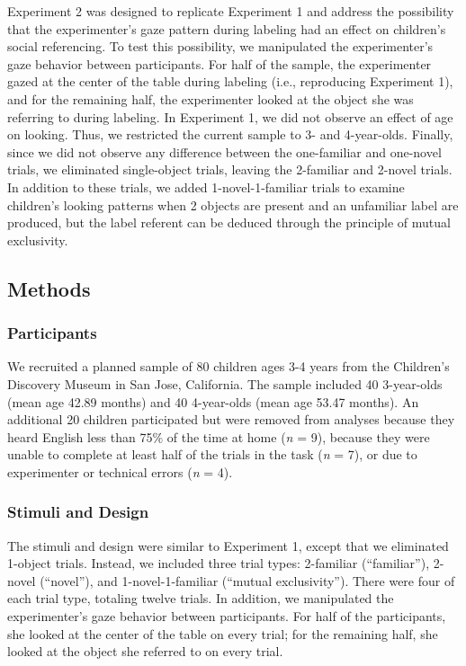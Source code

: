\documentclass[10pt, letterpaper]{article}
\begin{document}
Experiment 2 was designed to replicate Experiment 1 and address the
possibility that the experimenter's gaze pattern during labeling had an
effect on children's social referencing. To test this possibility, we
manipulated the experimenter's gaze behavior between participants. For
half of the sample, the experimenter gazed at the center of the table
during labeling (i.e., reproducing Experiment 1), and for the remaining
half, the experimenter looked at the object she was referring to during
labeling. In Experiment 1, we did not observe an effect of age on
looking. Thus, we restricted the current sample to 3- and 4-year-olds.
Finally, since we did not observe any difference between the
one-familiar and one-novel trials, we eliminated single-object trials,
leaving the 2-familiar and 2-novel trials. In addition to these trials,
we added 1-novel-1-familiar trials to examine children's looking
patterns when 2 objects are present and an unfamiliar label are
produced, but the label referent can be deduced through the principle of
mutual exclusivity.

\subsection{Methods}\label{methods-1}

\subsubsection{Participants}\label{participants-1}

We recruited a planned sample of 80 children ages 3-4 years from the
Children's Discovery Museum in San Jose, California. The sample included
40 3-year-olds (mean age 42.89 months) and 40 4-year-olds (mean age
53.47 months). An additional 20 children participated but were removed
from analyses because they heard English less than 75\% of the time at
home (\emph{n} = 9), because they were unable to complete at least half
of the trials in the task (\emph{n} = 7), or due to experimenter or
technical errors (\emph{n} = 4).

\subsubsection{Stimuli and Design}\label{stimuli-and-design-1}

The stimuli and design were similar to Experiment 1, except that we
eliminated 1-object trials. Instead, we included three trial types:
2-familiar (``familiar''), 2-novel (``novel''), and 1-novel-1-familiar
(``mutual exclusivity''). There were four of each trial type, totaling
twelve trials. In addition, we manipulated the experimenter's gaze
behavior between participants. For half of the participants, she looked
at the center of the table on every trial; for the remaining half, she
looked at the object she referred to on every trial.
\end{document}
